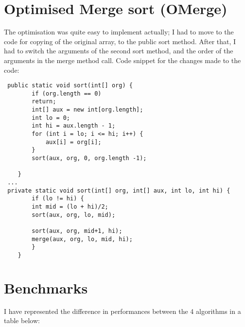 \documentclass[a4paper,11pt]{article}
\begin{document}
\section*{Optimised Merge sort (OMerge)}
The optimisation was quite easy to implement actually; I had to move to the code for copying of the original array, to the public sort method. After that, I had to switch the arguments of the second sort method, and the order of the arguments in the merge method call. Code snippet for the changes made to the code:

 \begin{verbatim}
 public static void sort(int[] org) {
        if (org.length == 0)
        return;
        int[] aux = new int[org.length];
        int lo = 0;
        int hi = aux.length - 1;
        for (int i = lo; i <= hi; i++) {
            aux[i] = org[i];
        }
        sort(aux, org, 0, org.length -1);
        
    }
 ...
 private static void sort(int[] org, int[] aux, int lo, int hi) {
        if (lo != hi) {
        int mid = (lo + hi)/2;
        sort(aux, org, lo, mid);

        sort(aux, org, mid+1, hi);
        merge(aux, org, lo, mid, hi);
        }
    }
\end{verbatim}


\section*{Benchmarks}

I have represented the difference in performances between the 4 algorithms in a table below:
\end{document}
